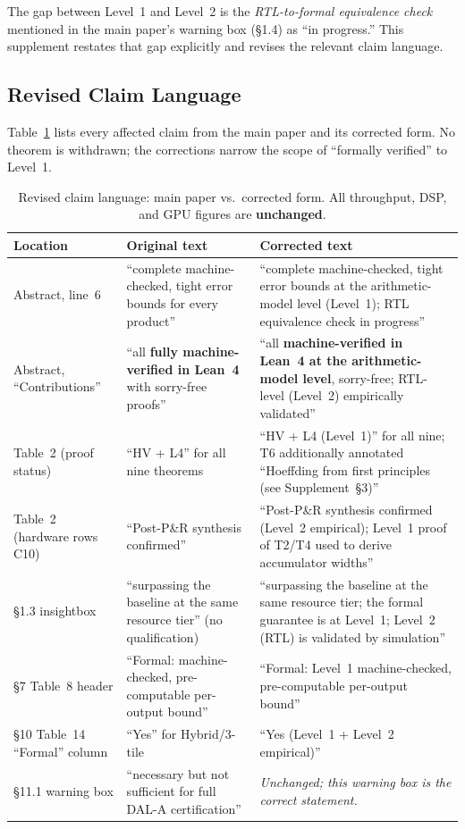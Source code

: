 \documentclass[11pt,a4paper]{article}
\theoremstyle{definition}
\theoremstyle{plain}
\theoremstyle{remark}
\begin{document}
The gap between Level~1 and Level~2 is the \emph{RTL-to-formal equivalence
check} mentioned in the main paper's warning box (\S1.4) as ``in progress.''
This supplement restates that gap explicitly and revises the relevant
claim language.

\subsection{Revised Claim Language}
\label{sec:scope-rev}

Table~\ref{tab:claims-revised} lists every affected claim from the
main paper and its corrected form.
No theorem is withdrawn; the corrections narrow the scope of
``formally verified'' to Level~1.

\begin{table}[h]
\centering
\caption{Revised claim language: main paper vs.\ corrected form.
All throughput, DSP, and GPU figures are \textbf{unchanged}.}
\label{tab:claims-revised}
\small
\begin{tabularx}{\textwidth}{p{2.5cm}p{5.5cm}p{5.5cm}}
\toprule
Location & Original text & Corrected text \\
\midrule
Abstract, line~6 &
``complete machine-checked, tight error bounds for every product'' &
``complete machine-checked, tight error bounds at the arithmetic-model level
(Level~1); RTL equivalence check in progress'' \\
\addlinespace
Abstract,
``Contributions'' &
``all \textbf{fully machine-verified in Lean~4} with sorry-free proofs'' &
``all \textbf{machine-verified in Lean~4 at the arithmetic-model level},
sorry-free; RTL-level (Level~2) empirically validated'' \\
\addlinespace
Table~2
(proof status) &
``HV + L4'' for all nine theorems &
``HV + L4 (Level~1)'' for all nine; T6 additionally annotated
``Hoeffding from first principles (see Supplement~\S3)'' \\
\addlinespace
Table~2
(hardware rows C10) &
``Post-P\&R synthesis confirmed'' &
``Post-P\&R synthesis confirmed (Level~2 empirical); Level~1 proof
of T2/T4 used to derive accumulator widths'' \\
\addlinespace
\S1.3 insightbox &
``surpassing the baseline at the same resource tier'' (no qualification)
&
``surpassing the baseline at the same resource tier; the formal guarantee
is at Level~1; Level~2 (RTL) is validated by simulation'' \\
\addlinespace
\S7 Table~8 
header &
``Formal: machine-checked, pre-computable per-output bound'' &
``Formal: Level~1 machine-checked, pre-computable per-output bound'' \\
\addlinespace
\S10 Table~14
``Formal'' column &
``Yes'' for Hybrid/3-tile &
``Yes (Level~1 + Level~2 empirical)'' \\
\addlinespace
\S11.1 warning box &
``necessary but not sufficient for full DAL-A certification'' &
\emph{Unchanged; this warning box is the correct statement.} \\
\bottomrule
\end{tabularx}
\end{table}
\end{document}
